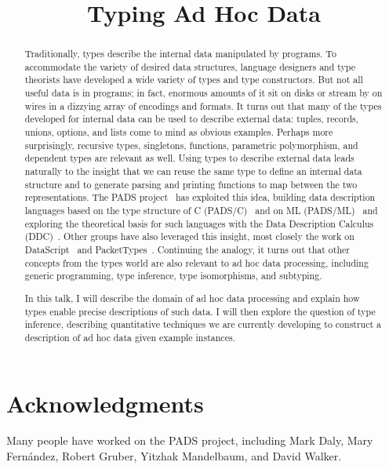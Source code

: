 \documentclass[nocopyrightspace]{sigplanconf}
\begin{document}
\title{Typing Ad Hoc Data}



\maketitle{}
\begin{abstract}
Traditionally, types describe the internal data manipulated by
programs.  To accommodate the variety of desired data structures,
language designers and type theorists have developed a wide variety of
types and type constructors.  But not all useful data is in programs;
in fact, enormous amounts of it sit on disks or stream by on wires in
a dizzying array of encodings and formats.  It turns out that many of
the types developed for internal data can be used to describe external
data: tuples, records, unions, options, and lists come to mind as
obvious examples.  Perhaps more surprisingly, recursive types,
singletons, functions, parametric polymorphism, and dependent types
are relevant as well.  Using types to describe external data leads
naturally to the insight that we can reuse the same type to define an
internal data structure and to generate parsing and printing functions
to map between the two representations.  The PADS
project~\cite{padsproject} has exploited this idea, building data
description languages based on the type structure of C
(PADS/C)~\cite{fisher+:pads} and on ML
(PADS/ML)~\cite{mandelbaum+:pads-ml} and exploring the theoretical
basis for such languages with the Data Description Calculus
(DDC)~\cite{fisher+:next700ddl}.
Other groups have also leveraged this
insight, most closely the work on DataScript~\cite{gpce02} and
PacketTypes~\cite{sigcomm00}. 
Continuing the analogy, it turns out that other concepts from the
types world are also relevant to ad hoc data processing, including
generic programming, type inference, type isomorphisms, and subtyping.

In this talk, I will describe the domain of ad hoc data processing and
explain how types enable precise descriptions of such data.  I will
then explore the question of type inference, describing quantitative
techniques we are currently developing to construct a description of
ad hoc data given example instances.


\end{abstract}
\section*{Acknowledgments}
Many people have worked on the PADS project, including 
Mark Daly, Mary Fern\'andez,
Robert Gruber, Yitzhak Mandelbaum, and David Walker. 



%

%
\end{document}
